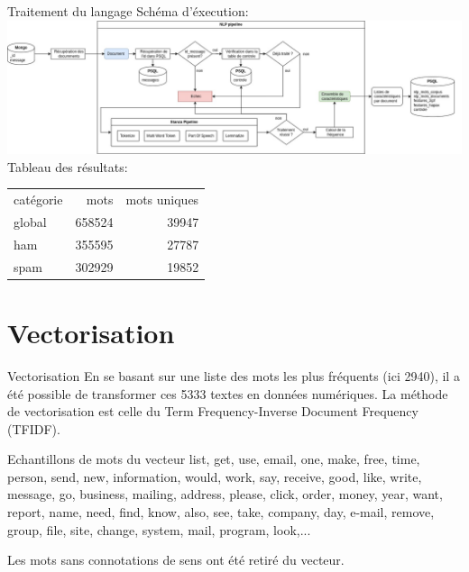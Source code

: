 \documentclass[xelatex,11pt, xcolor=dvipsnames]{beamer}
\begin{document}
\begin{frame}{Traitement du langage}
	Schéma d'éxecution:
	\includegraphics[width=\linewidth]{img/nlp}
	Tableau des résultats:
	\begin{table}[H]
            \centering
            \begin{tabular}{l|rr}
                catégorie & mots & mots uniques \\
                global & 658524 & 39947 \\
                \hline
                ham & 355595 & 27787 \\
                \hline
                spam & 302929 & 19852 \\
            \end{tabular}
        \end{table}
\end{frame}

\section{Vectorisation}
\begin{frame}{Vectorisation}
	En se basant sur une liste des mots les plus fréquents (ici 2940), il a été possible de transformer ces 5333 textes en données numériques.
	La méthode de vectorisation est celle du Term Frequency-Inverse Document Frequency (TFIDF).
	\begin{block}{Echantillons de mots du vecteur}
		list, get, use, email, one, make, free, time, person, send, new, information, would, work,
 		say, receive, good, like, write, message, go, business, mailing, address, please, click,
 		order, money, year, want, report, name, need, find, know, also, see, take, company, day,
 		e-mail, remove, group, file, site, change, system, mail, program, look,...
	\end{block}
	Les mots sans connotations de sens ont été retiré du vecteur.
\end{frame}
\end{document}
